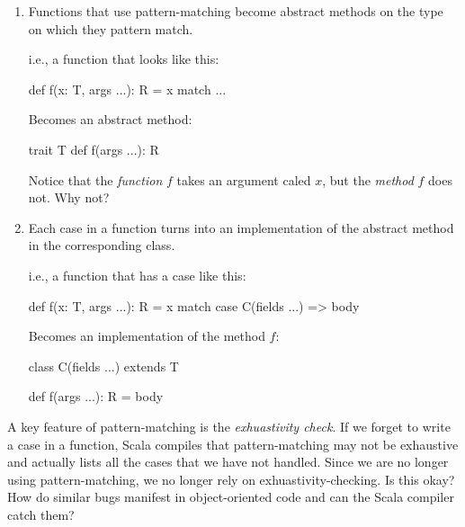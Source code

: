 \documentclass{book}
\begin{document}
\begin{enumerate}

  \item Functions that use pattern-matching become abstract methods on the type
  on which they pattern match.

  i.e., a function that looks like this:

  \begin{scalacode}
  def f(x: T, args ...): R = x match { ... }
  \end{scalacode}

  Becomes an abstract method:

  \begin{scalacode}
  trait T {
    def f(args ...): R
  }
  \end{scalacode}

  \begin{think}
  Notice that the \emph{function} $f$ takes an argument caled $x$, but
  the \emph{method} $f$ does not. Why not?
  \end{think}

  \item Each case in a function turns into an implementation of the abstract
  method in the corresponding class.

  i.e., a function that has a case like this:

  \begin{scalacode}
  def f(x: T, args ...): R = x match {
    case C(fields ...) => body
  }
  \end{scalacode}

  Becomes an implementation of the method $f$:

  \begin{scalacode}
  class C(fields ...) extends T {

    def f(args ...): R = body
  }
  \end{scalacode}

\end{enumerate}

\begin{think}
A key feature of pattern-matching is the \emph{exhuastivity check}. If
we forget to write a case in a function, Scala compiles that pattern-matching
may not be exhaustive and actually lists all the cases that we have not
handled. Since we are no longer using pattern-matching, we no longer rely
on exhuastivity-checking. Is this okay? How do similar bugs manifest in
object-oriented code and can the Scala compiler catch them?
\end{think}
\end{document}
